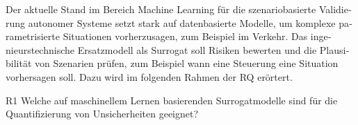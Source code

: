 


\begin{otherlanguage}{ngerman}


Der aktuelle Stand im Bereich Machine Learning für die szenariobasierte Validierung autonomer Systeme setzt stark auf datenbasierte Modelle, um komplexe parametrisierte Situationen vorherzusagen, zum Beispiel im Verkehr. Das ingenieurstechnische Ersatzmodell als Surrogat soll Risiken bewerten und die Plausibilität von Szenarien prüfen, zum Beispiel wann eine Steuerung eine Situation vorhersagen soll. Dazu wird im folgenden Rahmen der RQ erörtert.

  \newline
R1 Welche auf maschinellem Lernen basierenden Surrogatmodelle sind für die Quantifizierung von Unsicherheiten geeignet?


\end{otherlanguage}
